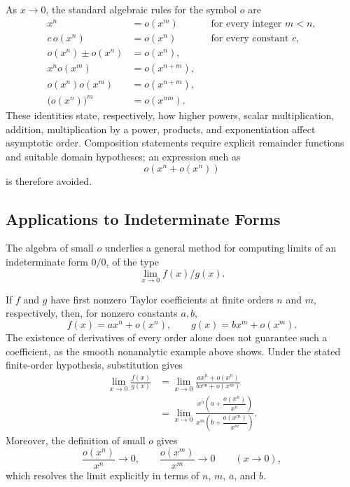 As $x \to 0$, the standard algebraic rules for the symbol $o$ are
\[
\begin{aligned}
x^n &= o(x^m) &&\text{for every integer }m<n,\\
c\,o(x^n) &= o(x^n) &&\text{for every constant }c,\\
o(x^n) \pm o(x^n) &= o(x^n),\\
x^n o(x^m) &= o(x^{n+m}),\\
o(x^n)o(x^m) &= o(x^{n+m}),\\
\bigl(o(x^n)\bigr)^m &= o(x^{nm}).
\end{aligned}
\]
These identities state, respectively, how higher powers, scalar multiplication, addition, multiplication by a power, products, and exponentiation affect asymptotic order.
Composition statements require explicit remainder functions and suitable
domain hypotheses; an expression such as
\[
o(x^n+o(x^n))
\]
 is therefore
avoided.

\subsection{Applications to Indeterminate Forms}

The algebra of small $o$ underlies a general method for computing limits of an indeterminate form $0/0$, of the type
\[
\lim_{x \to 0} f(x)/g(x).
\]

If $f$ and $g$ have first nonzero Taylor coefficients at finite orders
$n$ and $m$, respectively, then, for nonzero constants $a,b$,
\[
f(x)=ax^n+o(x^n),
\qquad
g(x)=bx^m+o(x^m).
\]
The existence of derivatives of every order alone does not guarantee such
a coefficient, as the smooth nonanalytic example above shows. Under the
stated finite-order hypothesis, substitution gives
\[
\begin{aligned}
\lim_{x \to 0} \frac{f(x)}{g(x)} &= \lim_{x \to 0} \frac{a x^n + o(x^n)}{b x^m + o(x^m)} \\
&= \lim_{x \to 0} \frac{x^n \left( a + \dfrac{o(x^n)}{x^n} \right)}{x^m \left( b + \dfrac{o(x^m)}{x^m} \right)}.
\end{aligned}
\]
Moreover, the definition of small $o$ gives
\[
\frac{o(x^n)}{x^n}\longrightarrow0,
\qquad
\frac{o(x^m)}{x^m}\longrightarrow0
\qquad (x\to0),
\]
which resolves the limit explicitly in terms of $n$, $m$, $a$, and $b$.

